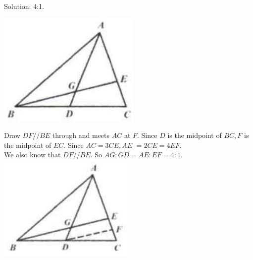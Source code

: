 \documentclass[10pt]{article}
\begin{document}
Solution: 4:1.
\begin{center}
\includegraphics[max width=\textwidth]{2025_04_17_97bc1f7e44d93c271a88g-106(3)}
\end{center}

Draw \(D F / / B E\) through and meets \(A C\) at \(F\). Since \(D\) is the midpoint of \(B C, F\) is the midpoint of \(E C\). Since \(A C=3 C E, A E\) \(=2 C E=4 E F\).\\
We also know that \(D F / / B E\). So \(A G: G D=A E: E F=4: 1\).\\
\includegraphics[max width=\textwidth, center]{2025_04_17_97bc1f7e44d93c271a88g-106(2)}
\end{document}
